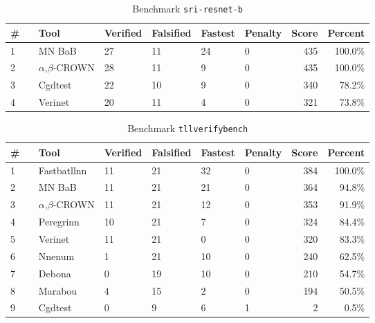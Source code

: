 
\begin{table}[h]
\begin{center}
\caption{Benchmark \texttt{sri-resnet-b}} \label{tab:cat_{cat}}
{\setlength{\tabcolsep}{2pt}
\begin{tabular}[h]{@{}llllllrr@{}}
\toprule
\textbf{\# ~} & \textbf{Tool} & \textbf{Verified} & \textbf{Falsified} & \textbf{Fastest} & \textbf{Penalty} & \textbf{Score} & \textbf{Percent}\\
\midrule
1 & MN BaB & 27 & 11 & 24 & 0 & 435 & 100.0\% \\
2 & $\alpha$,$\beta$-CROWN & 28 & 11 & 9 & 0 & 435 & 100.0\% \\
3 & Cgdtest & 22 & 10 & 9 & 0 & 340 & 78.2\% \\
4 & Verinet & 20 & 11 & 4 & 0 & 321 & 73.8\% \\
\bottomrule
\end{tabular}
}
\end{center}
\end{table}




\begin{table}[h]
\begin{center}
\caption{Benchmark \texttt{tllverifybench}} \label{tab:cat_{cat}}
{\setlength{\tabcolsep}{2pt}
\begin{tabular}[h]{@{}llllllrr@{}}
\toprule
\textbf{\# ~} & \textbf{Tool} & \textbf{Verified} & \textbf{Falsified} & \textbf{Fastest} & \textbf{Penalty} & \textbf{Score} & \textbf{Percent}\\
\midrule
1 & Fastbatllnn & 11 & 21 & 32 & 0 & 384 & 100.0\% \\
2 & MN BaB & 11 & 21 & 21 & 0 & 364 & 94.8\% \\
3 & $\alpha$,$\beta$-CROWN & 11 & 21 & 12 & 0 & 353 & 91.9\% \\
4 & Peregrinn & 10 & 21 & 7 & 0 & 324 & 84.4\% \\
5 & Verinet & 11 & 21 & 0 & 0 & 320 & 83.3\% \\
6 & Nnenum & 1 & 21 & 10 & 0 & 240 & 62.5\% \\
7 & Debona & 0 & 19 & 10 & 0 & 210 & 54.7\% \\
8 & Marabou & 4 & 15 & 2 & 0 & 194 & 50.5\% \\
9 & Cgdtest & 0 & 9 & 6 & 1 & 2 & 0.5\% \\
\bottomrule
\end{tabular}
}
\end{center}
\end{table}



